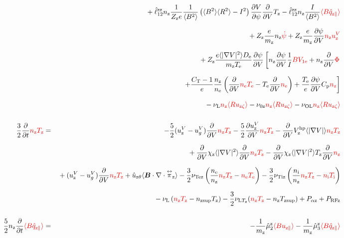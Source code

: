 \documentclass[11pt]{article}
\def\bvec#1{\leavevmode\hbox{\boldmath$#1$}}
\let\vec=\bvec
\def\r#1{{\rm#1}}
\def\aves#1{\langle#1\rangle}
\def\dd#1#2{\frac{\partial #1}{\partial #2}}
\def\tensor#1{\mathord{\displaystyle\mathop{#1}^\leftrightarrow}}
\def\para{\parallel}
\def\ddV{\frac{\partial}{\partial V}}
\def\ddt{\frac{\partial}{\partial t}}
\def\mz{m_\r{z}}
\def\nee{n_\r{e}}
\def\ni{n_\r{i}}
\def\nz{n_\r{z}}
\def\Te{T_\r{e}}
\def\Ti{T_\r{i}}
\def\Tz{T_\r{z}}
\def\Zz{Z_\r{z}}
\def\uzt#1{u_{\r{#1}\zeta}}
\def\upara#1{u_{\r{#1}\para}}
\def\uhatth#1{\hat{u}_{\r{#1}\theta}}
\def\qhatpara#1{\hat{q}_{\r{#1}\para}}
\def\uV#1{u_\r{#1}^V}
\def\ugV{u_{g}^V}
\def\chis#1{\chi_\r{#1}}
\def\De{D_\r{e}}
\def\nun#1{\nu_\r{0#1}}
\def\nsup#1{n_\r{#1sup}}
\def\Tsup#1{T_\r{#1sup}}
\def\nuLT#1{\nu_{\r{L}T_\r{#1}}}
\def\PRF#1{P_\r{RF#1}}
\def\Palp#1{P_{\alpha\r{#1}}}
\def\bri{\aves{B^2}\aves{R^2} - I^2}
\def\nuL{\nu_\r{L}}
\def\nuOL{\nu_\r{OL}}
\def\red#1{\textcolor{red}{#1}}
\begin{document}
\begin{eqnarray}
\nonumber\\[2.5mm]&&{}
  + \hat{\ell}_{12}^\r{zz} \nz \frac{1}{\Zz e} \frac{1}{\aves{B^2}} \left( \bri \right)
    \dd{V}{\psi} \ddV \Tz
  - \hat{\ell}_{12}^\r{zz} \nz \frac{I}{\aves{B^2}} \red{\aves{B \qhatpara{z}}}
\nonumber\\[2.5mm]&&{}
%
  + \Zz \frac{e}{\mz}              \nz \red{\dot{\psi}}
%
  + \Zz \frac{e}{\mz} \dd{\psi}{V} \red{\nz \uV{z}}
%
\nonumber\\[2.5mm]&&{}
%
%
  + \Zz \frac{e \aves{|\nabla V|^2} \De}{\mz\Te} \dd{\psi}{V} 
  \left[   \nz \dd{\psi}{V} \frac{1}{I} \red{B V_{1\r{e}}}
         + \nz \ddV \red{\Phi} \right.
\nonumber\\[2.5mm]&&{}
  \left. + \frac{C_\r{T}-1}{e} \frac{\nz}{\nee}
           \left( \ddV \red{\nee \Te} - \Te \ddV \red{\nee} \right)
         + \frac{\Te}{e} \dd{\psi}{V} C_\r{p} \red{\nz} \right]
\nonumber\\[2.5mm]&&{}
%
  - \nuL  \red{\nz \aves{R \uzt{z}}}
%
  - \nun{z} \red{\nz \aves{R \uzt{z}}}
%
  - \nuOL \red{\nz \aves{R \uzt{z}}}
\\[5mm]
  \frac{3}{2} \ddt \red{\nz \Tz}  &=& 
%
  - \frac{5}{2} ( \uV{z} - \ugV ) \ddV \red{\nz \Tz}
%
  - \frac{5}{2} \dd{\uV{z}}{V} \red{\nz \Tz}
%
  - \ddV V_\r{z}^\r{hp} \aves{|\nabla V|} \red{\nz \Tz}
\nonumber\\[2.5mm]&&{}
  + \ddV \chis{z} \aves{|\nabla V|^2} \ddV \red{\nz \Tz}
  - \ddV \chis{z} \aves{|\nabla V|^2} \Tz \ddV \red{\nz}
\nonumber\\[2.5mm]&&{}
%
  + ( \uV{z} - \ugV ) \ddV \red{\nz \Tz}
%
  + \uhatth{z} \aves{\vec{B}\cdot\nabla\cdot\tensor{\pi}_\r{z}}
%
  - \frac{3}{2} \nu_\r{Tez} \left(\frac{\nee}{\nz} \red{\nz \Tz} - \red{\nee \Te} \right)
  - \frac{3}{2} \nu_\r{Tiz} \left(\frac{\ni }{\nz} \red{\nz \Tz} - \red{\ni  \Ti} \right)
\nonumber\\[2.5mm]&&{}
%
  - \nuL \left(\red{\nz \Tz}  - \nsup{z} \Tz \right)
%
  - \frac{3}{2} \nuLT{z} (\red{\nz \Tz} - \nz \Tsup{z})
%
  + \Palp{z}
%
  + \PRF{z}
\\[5mm]
 \frac{5}{2} \nz \ddt \red{\aves{B \qhatpara{z}}} &=&
%
  - \frac{1}{\mz} \hat{\mu}_2^\r{z} \red{\aves{B \upara{z}}}
  - \frac{1}{\mz} \hat{\mu}_3^\r{z} \red{\aves{B \qhatpara{z}}}

\end{eqnarray}
\end{document}
